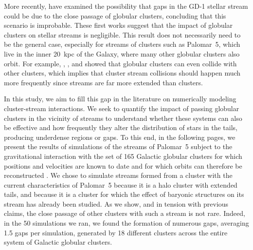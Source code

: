   More recently, \citet{2022ApJ...941..129D} have examined the possibility that gaps in the GD-1 stellar stream could be due to the close passage of globular clusters, concluding that this scenario is improbable. These first works suggest that the impact of globular clusters on stellar streams is negligible. This result does not necessarily need to be the general case, especially for streams of clusters such as Palomar~5, which live in the inner 20~kpc of the Galaxy, where many other globular clusters also orbit. For example, \citet{2018A&A...620A.154K}, \citet{2019A&A...622A..86M}, and \citet{2023A&A...678A..69I} showed that globular clusters can even collide with other clusters, which implies that cluster stream collisions should happen much more frequently since streams are far more extended than clusters. 
  
  In this study, we aim to fill this gap in the literature on numerically modeling cluster-stream interactions. We seek to quantify the impact of passing globular clusters in the vicinity of streams to understand whether these systems can also be effective and how frequently they alter the distribution of stars in the tails, producing underdense regions or gaps. To this end, in the following pages, we present the results of simulations of the streams of Palomar~5 subject to the gravitational interaction with the set of 165 Galactic globular clusters for which positions and velocities are known to date and for which orbits can therefore be reconstructed \parencite{2021MNRAS.505.5957B}. We chose to simulate streams formed from a cluster with the current characteristics of Palomar~5 because it is a halo cluster with extended tails, and because it is a cluster for which the effect of baryonic structures on its stream has already been studied. As we show, and in tension with previous claims, the close passage of other clusters with such a stream is not rare. Indeed, in the 50 simulations we ran, we found the formation of numerous gaps, averaging 1.5 gaps per simulation, generated by 18 different clusters across the entire system of Galactic globular clusters.


